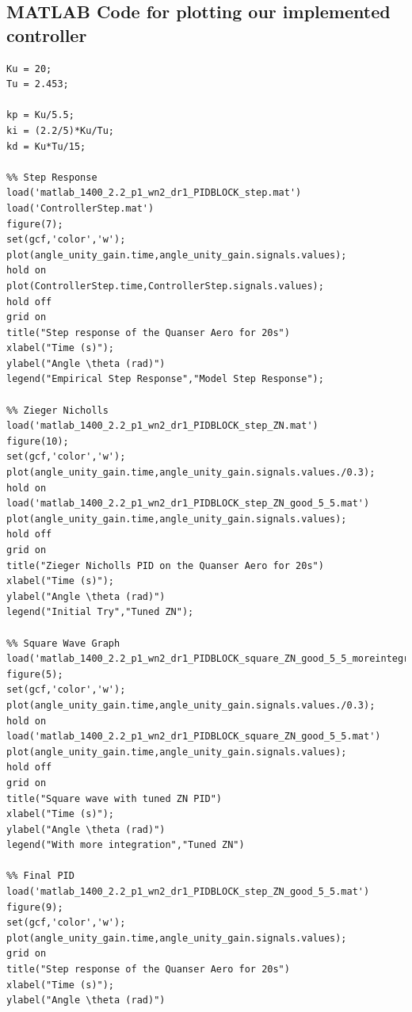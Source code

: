 \documentclass[11pt]{article}
\begin{document}
\subsection{MATLAB Code for plotting our implemented controller}
\begin{lstlisting}[frame=single]
% Zieger Nicholls PID gains
Ku = 20;
Tu = 2.453;

kp = Ku/5.5;
ki = (2.2/5)*Ku/Tu;
kd = Ku*Tu/15;

%% Step Response
load('matlab_1400_2.2_p1_wn2_dr1_PIDBLOCK_step.mat')
load('ControllerStep.mat')
figure(7);
set(gcf,'color','w');
plot(angle_unity_gain.time,angle_unity_gain.signals.values);
hold on
plot(ControllerStep.time,ControllerStep.signals.values);
hold off 
grid on
title("Step response of the Quanser Aero for 20s")
xlabel("Time (s)");
ylabel("Angle \theta (rad)")
legend("Empirical Step Response","Model Step Response");

%% Zieger Nicholls
load('matlab_1400_2.2_p1_wn2_dr1_PIDBLOCK_step_ZN.mat')
figure(10);
set(gcf,'color','w');
plot(angle_unity_gain.time,angle_unity_gain.signals.values./0.3);
hold on
load('matlab_1400_2.2_p1_wn2_dr1_PIDBLOCK_step_ZN_good_5_5.mat')
plot(angle_unity_gain.time,angle_unity_gain.signals.values);
hold off 
grid on
title("Zieger Nicholls PID on the Quanser Aero for 20s")
xlabel("Time (s)");
ylabel("Angle \theta (rad)")
legend("Initial Try","Tuned ZN");

%% Square Wave Graph
load('matlab_1400_2.2_p1_wn2_dr1_PIDBLOCK_square_ZN_good_5_5_moreintegration2_1.mat')
figure(5);
set(gcf,'color','w');
plot(angle_unity_gain.time,angle_unity_gain.signals.values./0.3);
hold on
load('matlab_1400_2.2_p1_wn2_dr1_PIDBLOCK_square_ZN_good_5_5.mat')
plot(angle_unity_gain.time,angle_unity_gain.signals.values);
hold off
grid on
title("Square wave with tuned ZN PID")
xlabel("Time (s)");
ylabel("Angle \theta (rad)")
legend("With more integration","Tuned ZN")

%% Final PID
load('matlab_1400_2.2_p1_wn2_dr1_PIDBLOCK_step_ZN_good_5_5.mat')
figure(9);
set(gcf,'color','w');
plot(angle_unity_gain.time,angle_unity_gain.signals.values);
grid on
title("Step response of the Quanser Aero for 20s")
xlabel("Time (s)");
ylabel("Angle \theta (rad)")
\end{lstlisting}
\end{document}
